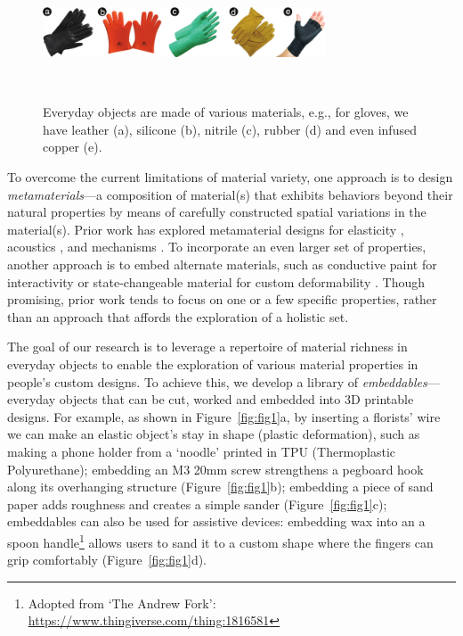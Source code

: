 \begin{figure} [t]
  \centering
  \includegraphics[width=0.75\textwidth]{figures/gloves}
  \caption{Everyday objects are made of various materials, e.g., for gloves, we have leather (a), silicone (b), nitrile (c), rubber (d) and even infused copper (e).}~\label{fig:gloves}
\end{figure}

To overcome the current limitations of material variety, one approach is to design \textit{metamaterials}---a composition of material(s) that exhibits behaviors beyond their natural properties by means of carefully constructed spatial variations in the material(s). Prior work has explored metamaterial designs for elasticity \cite{panetta2015elastic, schumacher2015microstructures}, acoustics \cite{memoli2017metamaterial}, and mechanisms \cite{ion2016metamaterial}. To incorporate an even larger set of properties, another approach is to embed alternate materials, such as conductive paint for interactivity \cite{savage2014series} or state-changeable material for custom deformability \cite{groeger2016hotflex}. Though promising, prior work tends to focus on one or a few specific properties, rather than an approach that affords the exploration of a holistic set.

The goal of our research is to leverage a repertoire of material richness in everyday objects to enable the exploration of various material properties in people's custom designs. 
To achieve this, we develop a library of \textit{embeddables}---everyday objects that can be cut, worked and embedded into 3D printable designs. For example, as shown in Figure~\ref{fig:fig1}a, by inserting a florists' wire we can make an elastic object's stay in shape (plastic deformation), such as making a phone holder from a `noodle' printed in TPU (Thermoplastic Polyurethane); embedding an M3 20mm screw strengthens a pegboard hook along its overhanging structure (Figure~\ref{fig:fig1}b); embedding a piece of sand paper adds roughness and creates a simple sander (Figure~\ref{fig:fig1}c); embeddables can also be used for assistive devices: embedding wax into an a spoon handle\footnote{Adopted from `The Andrew Fork': \url{https://www.thingiverse.com/thing:1816581}} allows users to sand it to a custom shape where the fingers can grip comfortably (Figure~\ref{fig:fig1}d).


